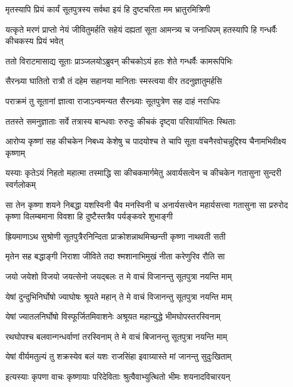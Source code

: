 \twolineshloka
{मृतस्यापि प्रियं कार्यं सूतपुत्रस्य सर्वथा}
{इयं हि दुष्टचरिता मम भ्रातुरमित्रिणी}


\threelineshloka
{यत्कृते मरणं प्राप्तो नेयं जीवितुमर्हति}
{सहेयं दह्यतां सूता आमन्त्र्य च जनाधिपम्}
{हतस्यापि हि गन्धर्वैः कीचकस्य प्रियं भवेत्}


\twolineshloka
{ततो विराटमासाद्य सूताः प्राञ्जलयोऽब्रुवन्}
{कीचकोऽयं हतः शेते गन्धर्वैः कामरूपिभिः}


\twolineshloka
{सैरन्ध्र्या घातितो रात्रौ तं दहेम सहानया}
{मानिताः स्मस्त्वया वीर तदनुज्ञातुमर्हसि}


\twolineshloka
{पराक्रमं तु सूतानां ज्ञात्वा राजाऽन्वमन्यत}
{सैरन्ध्र्याः सूतपुत्रेण सह दाहं नराधिपः}


\twolineshloka
{ततस्ते समनुज्ञाताः सर्वे तत्रास्य बान्धवाः}
{रुरुदुः कीचकं दृष्ट्वा परिवार्याभितः स्थिताः}


\twolineshloka
{आरोप्य कृष्णां सह कीचकेन निबध्य केशेषु च पादयोश्च}
{ते चापि सूता वचनैरवोचन्नुद्दिश्य चैनामभिवीक्ष्य कृष्णाम्}


\twolineshloka
{यस्याः कृतेऽयं निहतो महात्मा तस्माद्धि सा कीचकमार्गमेतु}
{अवार्यसत्वेन च कीचकेन गतासुना सुन्दरी स्वर्गलोकम्}


\threelineshloka
{सा तेन कृष्णा शयने निबद्धा यशस्विनी चैव मनस्विनी च}
{अनार्यसत्त्वेन महार्यसत्त्वा गतासुना सा प्ररुरोद कृष्णा}
{विलम्बमाना विवशा हि दुष्टैस्तत्रैव पर्यङ्कवरे शुभाङ्गी}


\twolineshloka
{ह्रियमाणाऽथ सुश्रोणी सूतपुत्रैरनिन्दिता}
{प्राक्रोशन्नाथमिच्छन्ती कृष्णा नाथवती सती}


\twolineshloka
{मृतेन सह बद्धाङ्गी निराशा जीविते तदा}
{श्मशानाभिमुखं नीता करेणुरिव रौति सा}




\twolineshloka
{जयो जयेशो विजयो जयत्सेनो जयद्बलः}
{त मे वाचं विजानन्तु सूतपुत्रा नयन्ति माम्}


\twolineshloka
{येषां दुन्दुभिनिर्घोषो ज्याघोषः श्रूयते महान्}
{ते मे वाचं विजानन्तु सूतपुत्रा नयन्ति माम्}


\twolineshloka
{येषां ज्यातलनिर्घोषो विस्फूर्जितमिवाशनेः}
{अश्रूयत महान्युद्धे भीमघोपस्तरस्विनाम्}


\twolineshloka
{रथघोपश्च बलवान्गन्धर्वाणां तरस्विनाम्}
{ते मे वाचं बिजानन्तु सूतपुत्रा नयन्ति माम्}


\twolineshloka
{येषां वीर्यमतुल्यं तु शक्रस्येव बलं यशः}
{राजसिंहा इवाग्र्यास्ते मां जानन्तु सुदुःखिताम्}


\twolineshloka
{इत्यस्याः कृपणा वाचः कृष्णायाः परिदेविताः}
{श्रुत्वैवाभ्युत्थितो भीमः शयनादविचारयन्}

